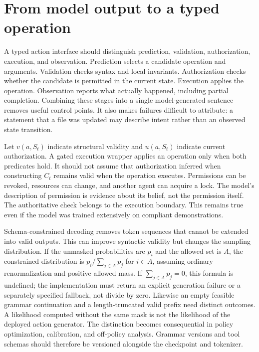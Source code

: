 \section{From model output to a typed operation}
\label{sec:C03:interfaces}
A typed action interface should distinguish prediction, validation, authorization, execution, and observation. Prediction selects a candidate operation and arguments. Validation checks syntax and local invariants. Authorization checks whether the candidate is permitted in the current state. Execution applies the operation. Observation reports what actually happened, including partial completion. Combining these stages into a single model-generated sentence removes useful control points. It also makes failures difficult to attribute: a statement that a file was updated may describe intent rather than an observed state transition.

Let $v(a,S_t)$ indicate structural validity and $u(a,S_t)$ indicate current authorization. A gated execution wrapper applies an operation only when both predicates hold. It should not assume that authorization inferred when constructing $C_t$ remains valid when the operation executes. Permissions can be revoked, resources can change, and another agent can acquire a lock. The model's description of permission is evidence about its belief, not the permission itself. The authoritative check belongs to the execution boundary. This remains true even if the model was trained extensively on compliant demonstrations.

Schema-constrained decoding removes token sequences that cannot be extended into valid outputs. This can improve syntactic validity but changes the sampling distribution. If the unmasked probabilities are $p_i$ and the allowed set is $A$, the constrained distribution is $p_i/\sum_{j\in A}p_j$ for $i\in A$, assuming ordinary renormalization and positive allowed mass. If $\sum_{j\in A}p_j=0$, this formula is undefined; the implementation must return an explicit generation failure or a separately specified fallback, not divide by zero. Likewise an empty feasible grammar continuation and a length-truncated valid prefix need distinct outcomes. A likelihood computed without the same mask is not the likelihood of the deployed action generator. The distinction becomes consequential in policy optimization, calibration, and off-policy analysis. Grammar versions and tool schemas should therefore be versioned alongside the checkpoint and tokenizer.

